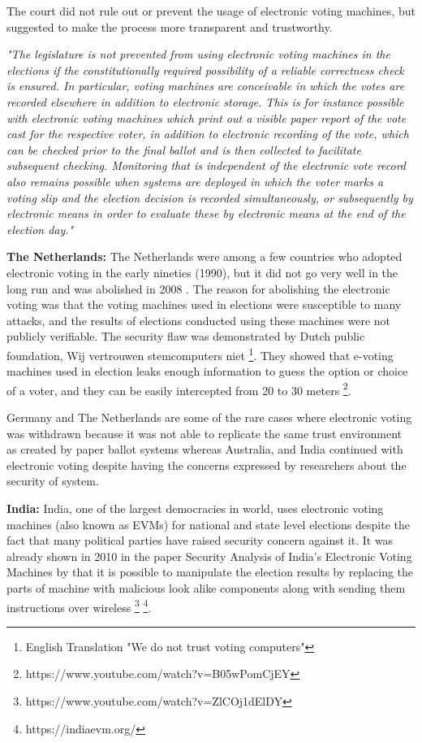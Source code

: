  \noindent	
  The court did not rule out or prevent the usage of electronic 
  voting machines,  but suggested to make the process more 
  transparent and trustworthy.  
  
  \textit{"The legislature is not prevented from using electronic voting machines 
  in the elections if the constitutionally required possibility of a 
  reliable correctness check is ensured. In particular, voting machines 
  are conceivable in which the votes are recorded elsewhere in addition
   to electronic storage. This is for instance possible with electronic
   voting machines which print out a visible paper report of the vote 
   cast for the respective voter, in addition to electronic recording 
   of the vote, which can be checked prior to the final ballot and is
    then collected to facilitate subsequent checking. Monitoring that is
     independent of the electronic vote record also remains possible when
     systems are deployed in which the voter marks a voting slip and the 
     election decision is recorded simultaneously, 
     or subsequently by electronic means in 
     order to evaluate these by electronic means at the end of the 
     election day."}
  
  \textbf{The Netherlands:}
  The Netherlands were among a few countries who adopted electronic voting 
  in the early nineties (1990), but it did not go very well in the long 
  run and was abolished in 2008 \citep{Jacobs2009}. 
  The reason for abolishing the electronic voting was that   
  the voting machines used in elections were susceptible to many attacks,
  and the results of elections conducted using these machines 
  were not publicly verifiable.  The security flaw was demonstrated by 
  Dutch public foundation, Wij vertrouwen stemcomputers niet
  \footnote{English Translation "We do not trust voting computers"}. 
  They showed that e-voting machines used in election leaks enough
  information to guess the option or choice of a voter, 
  and they can be easily intercepted from 20 to 30 meters
  \footnote{https://www.youtube.com/watch?v=B05wPomCjEY}. 
  
  
  Germany and The Netherlands are some of the rare cases where 
  electronic voting was withdrawn because it was not able to 
  replicate the same trust environment as created by paper 
  ballot systems whereas Australia, and India continued 
  with electronic voting despite having the concerns expressed 
  by researchers about the security of system. 
  
  \textbf{India:}
  India, one of the largest democracies in world, 
  uses electronic voting machines (also known as EVMs) for national 
  and state level  elections despite the fact that many political parties have raised security 
  concern against it. It was already shown in 2010 in the paper 
  Security Analysis of India's Electronic Voting Machines by 
  \cite{Wolchok:2010:SAI:1866307.1866309}  that it 
  is possible to manipulate the election results by replacing the 
  parts of machine with malicious look alike components along with sending 
  them instructions over wireless
  \footnote{https://www.youtube.com/watch?v=ZlCOj1dElDY} 
  \footnote{https://indiaevm.org/}. 
  
